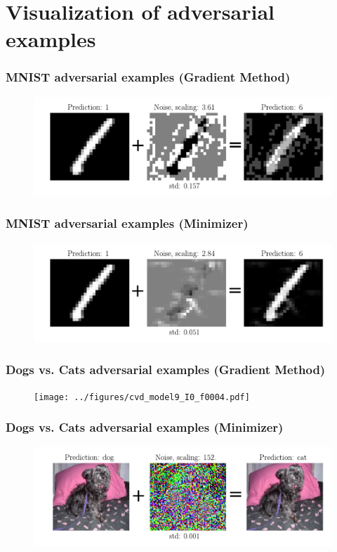 \documentclass[handout]{beamer}
\begin{document}
\section{Visualization of adversarial examples}

\begin{frame}
\frametitle{MNIST adversarial examples (Gradient Method)} 
\begin{figure}
\includegraphics[width=\linewidth]{../figures/mnist_model2_I0_f0276.pdf}
\end{figure}
\end{frame}

\begin{frame}
\frametitle{MNIST adversarial examples (Minimizer)} 
\begin{figure}
\includegraphics[width=\linewidth]{../figures/adv_example_minimizer_mnist.pdf}
\end{figure}
\end{frame}

\begin{frame}
\frametitle{Dogs vs. Cats adversarial examples (Gradient Method)} 
\begin{figure}
\texttt{[image: ../figures/cvd\_model9\_I0\_f0004.pdf]}
\end{figure}
\end{frame}

\begin{frame}
\frametitle{Dogs vs. Cats adversarial examples (Minimizer)} 
\begin{figure}
\includegraphics[width=\linewidth]{../figures/adv_example_minimizer_dogs_vs_cats.pdf}
\end{figure}
\end{frame}
\end{document}
